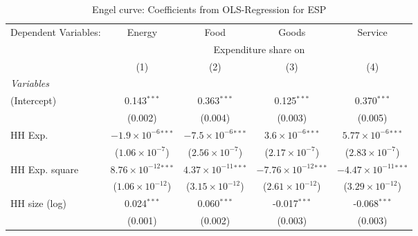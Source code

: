 
\begin{table}[htbp!]
   \centering
   \small
   \begin{adjustbox}{width = 1\textwidth, max height = 0.95\textheight, center}
      \begin{threeparttable}[b]
         \caption{\label{tab:Engel_parametric_ESP} Engel curve: Coefficients from OLS-Regression for ESP}
         \begin{tabular}{lcccc}
            \tabularnewline \midrule \midrule
            Dependent Variables: & Energy                         & Food                           & Goods                           & Service\\  
             & \multicolumn{4}{c}{Expenditure share on} \\ 
                                 & (1)                            & (2)                            & (3)                             & (4)\\  
            \midrule
            \emph{Variables}\\
            (Intercept)          & 0.143$^{***}$                  & 0.363$^{***}$                  & 0.125$^{***}$                   & 0.370$^{***}$\\   
                                 & (0.002)                        & (0.004)                        & (0.003)                         & (0.005)\\   
            HH Exp.              & $-1.9\times 10^{-6}$$^{***}$   & $-7.5\times 10^{-6}$$^{***}$   & $3.6\times 10^{-6}$$^{***}$     & $5.77\times 10^{-6}$$^{***}$\\    
                                 & ($1.06\times 10^{-7}$)         & ($2.56\times 10^{-7}$)         & ($2.17\times 10^{-7}$)          & ($2.83\times 10^{-7}$)\\    
            HH Exp. square       & $8.76\times 10^{-12}$$^{***}$  & $4.37\times 10^{-11}$$^{***}$  & $-7.76\times 10^{-12}$$^{***}$  & $-4.47\times 10^{-11}$$^{***}$\\    
                                 & ($1.06\times 10^{-12}$)        & ($3.15\times 10^{-12}$)        & ($2.61\times 10^{-12}$)         & ($3.29\times 10^{-12}$)\\    
            HH size (log)        & 0.024$^{***}$                  & 0.060$^{***}$                  & -0.017$^{***}$                  & -0.068$^{***}$\\   
                                 & (0.001)                        & (0.002)                        & (0.003)                         & (0.003)\\   

\end{tabular}
\end{threeparttable}
\end{adjustbox}
\end{table}
